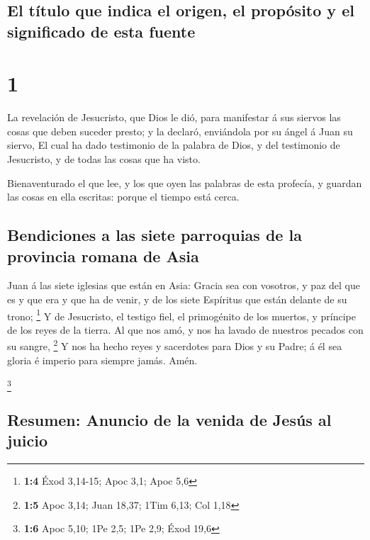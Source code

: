 \hypertarget{el-tuxedtulo-que-indica-el-origen-el-propuxf3sito-y-el-significado-de-esta-fuente}{%
\subsection{El título que indica el origen, el propósito y el
significado de esta
fuente}\label{el-tuxedtulo-que-indica-el-origen-el-propuxf3sito-y-el-significado-de-esta-fuente}}

\hypertarget{section}{%
\section{1}\label{section}}

 La revelación de Jesucristo, que Dios le dió, para
manifestar á sus siervos las cosas que deben suceder presto; y la
declaró, enviándola por su ángel á Juan su siervo,  El cual
ha dado testimonio de la palabra de Dios, y del testimonio de
Jesucristo, y de todas las cosas que ha visto.

 Bienaventurado el que lee, y los que oyen las palabras de
esta profecía, y guardan las cosas en ella escritas: porque el tiempo
está cerca.

\hypertarget{bendiciones-a-las-siete-parroquias-de-la-provincia-romana-de-asia}{%
\subsection{Bendiciones a las siete parroquias de la provincia romana de
Asia}\label{bendiciones-a-las-siete-parroquias-de-la-provincia-romana-de-asia}}

 Juan á las siete iglesias que están en Asia: Gracia sea con
vosotros, y paz del que es y que era y que ha de venir, y de los siete
Espíritus que están delante de su trono; \footnote{\textbf{1:4} Éxod
  3,14-15; Apoc 3,1; Apoc 5,6}  Y de Jesucristo, el testigo
fiel, el primogénito de los muertos, y príncipe de los reyes de la
tierra. Al que nos amó, y nos ha lavado de nuestros pecados con su
sangre, \footnote{\textbf{1:5} Apoc 3,14; Juan 18,37; 1Tim 6,13; Col
  1,18}  Y nos ha hecho reyes y sacerdotes para Dios y su
Padre; á él sea gloria é imperio para siempre jamás. Amén.

\footnote{\textbf{1:6} Apoc 5,10; 1Pe 2,5; 1Pe 2,9; Éxod 19,6}

\hypertarget{resumen-anuncio-de-la-venida-de-jesuxfas-al-juicio}{%
\subsection{Resumen: Anuncio de la venida de Jesús al
juicio}\label{resumen-anuncio-de-la-venida-de-jesuxfas-al-juicio}}

